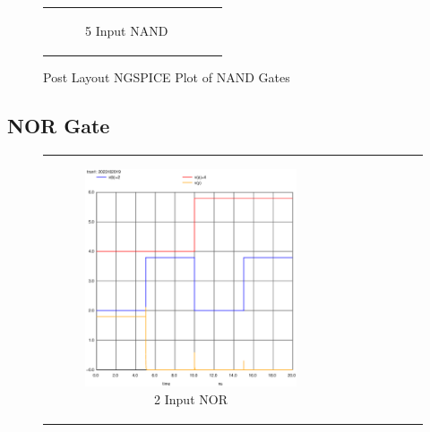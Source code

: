 \documentclass[conference]{IEEEtran}
\begin{document}
\begin{figure}[H]
\begin{tabular}{cc}
\begin{subfigure}{0.44\linewidth}
            \caption{5 Input NAND}
        \end{subfigure}
    \end{tabular}
    \caption{Post Layout NGSPICE Plot of NAND Gates}
\end{figure}

\subsection{NOR Gate}

\begin{figure}[H]
    \centering
    \begin{tabular}{cc}
        \begin{subfigure}{0.44\linewidth}
            \centering
            \includegraphics[width=\textwidth]{images/nor_cmos_post_tran.eps}
            \caption{2 Input NOR}
        \end{subfigure} &
        \begin{subfigure}{0.44\linewidth}
            \centering

\end{subfigure}
\end{tabular}
\end{figure}
\end{document}
